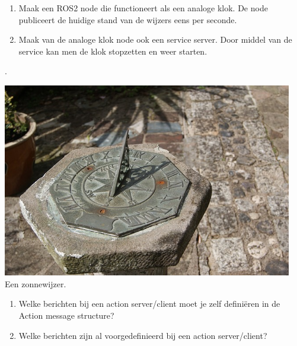 \begin{exercise}[Wijzerplaat]\mbox{}
\begin{minipage}{0.5\textwidth}
\begin{enumerate}
    \item Maak een ROS2 node die functioneert als een analoge klok. De node publiceert de huidige stand van de wijzers eens per seconde.
    \item Maak van de analoge klok node ook een service server. Door middel van de service kan men de klok stopzetten en weer starten.
\end{enumerate}.
\end{minipage}\hfill 
\begin{minipage}{0.4\textwidth}
\begin{center}
\includegraphics[width=0.95\textwidth]{Pictures/cc_pixabay_zonnwijzer.jpg}\\
Een zonnewijzer.
\end{center}
\end{minipage}
\end{exercise}

\newpage %

\begin{exercise}[Actie]\mbox{}%
\begin{enumerate}
    \item Welke berichten bij een action server/client moet je zelf definiëren in de Action message structure?
    \item Welke berichten zijn al voorgedefinieerd bij een action server/client?
\end{enumerate}
\end{exercise}

